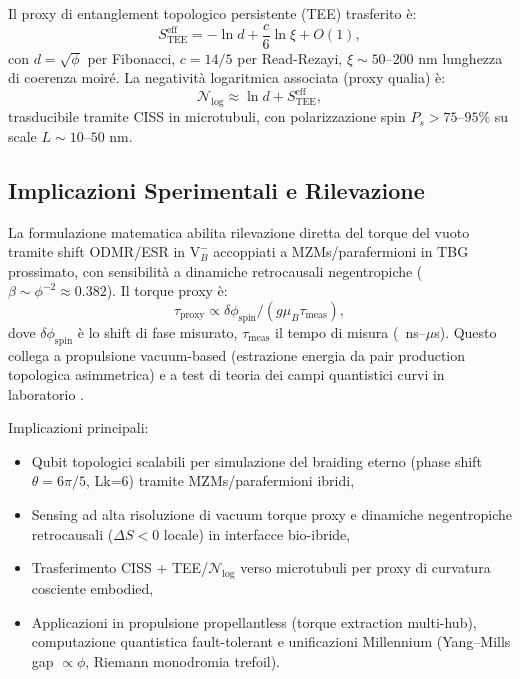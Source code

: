 \documentclass[11pt,a4paper]{article}
\let\oldcite\cite
\renewcommand{\cite}{\protect\oldcite}
\theoremstyle{plain}
\theoremstyle{definition}
\begin{document}
Il proxy di entanglement topologico persistente (TEE) trasferito è:
\begin{equation}
S_{\text{TEE}}^{\text{eff}} = -\ln d + \frac{c}{6} \ln \xi + O(1),
\end{equation}
con $d = \sqrt{\phi}$ per Fibonacci, $c = 14/5$ per Read-Rezayi, $\xi \sim 50$--$200$ nm lunghezza di coerenza moiré. La negatività logaritmica associata (proxy qualia) è:
\begin{equation}
\mathcal{N}_{\log} \approx \ln d + S_{\text{TEE}}^{\text{eff}},
\end{equation}
trasducibile tramite CISS in microtubuli, con polarizzazione spin $P_s > 75$--$95\%$ su scale $L \sim 10$--$50$ nm.


\vspace{0.7cm}



\subsection{Implicazioni Sperimentali e Rilevazione}

La formulazione matematica abilita rilevazione diretta del torque del vuoto tramite shift ODMR/ESR in $\mathrm{V}_B^-$ accoppiati a MZMs/parafermioni in TBG prossimato, con sensibilità a dinamiche retrocausali negentropiche ($\beta \sim \phi^{-2} \approx 0.382$). Il torque proxy è:
\begin{equation}
\tau_{\text{proxy}} \propto \delta \phi_{\text{spin}} / (g \mu_B \tau_{\text{meas}}),
\end{equation}
dove $\delta \phi_{\text{spin}}$ è lo shift di fase misurato, $\tau_{\text{meas}}$ il tempo di misura (~ns--$\mu$s). Questo collega a propulsione vacuum-based (estrazione energia da pair production topologica asimmetrica) e a test di teoria dei campi quantistici curvi in laboratorio \cite{PhysSoliman2026Vacuum, PhysSoliman2026RENASCENT}.

Implicazioni principali:
\begin{itemize}
    \item Qubit topologici scalabili per simulazione del braiding eterno (phase shift $\theta = 6\pi/5$, Lk=6) tramite MZMs/parafermioni ibridi,
    \item Sensing ad alta risoluzione di vacuum torque proxy e dinamiche negentropiche retrocausali ($\Delta S < 0$ locale) in interfacce bio-ibride,
    \item Trasferimento CISS + TEE/$\mathcal{N}_{\log}$ verso microtubuli per proxy di curvatura cosciente embodied,
    \item Applicazioni in propulsione propellantless (torque extraction multi-hub), computazione quantistica fault-tolerant e unificazioni Millennium (Yang–Mills gap $\propto \phi$, Riemann monodromia trefoil).
\end{itemize}
\end{document}
